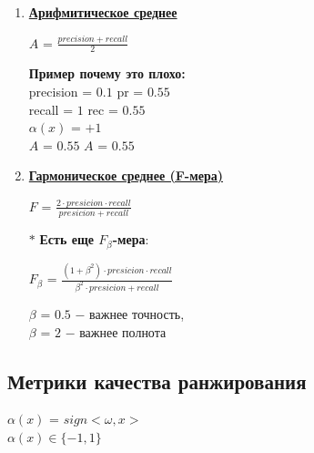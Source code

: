             \begin{enumerate}
                \item \underline{\textbf{Арифмитическое среднее}}\\
                    \begin{center}
                        $A$ = $\frac{precision + recall}{2}$
                    \end{center}
                    
                    \textbf{Пример почему это плохо:}\\
                    
                    precision = $0.1$ \quad\quad\quad pr = $0.55$\\
                    recall = $1$ \quad\quad\quad\quad\quad rec = $0.55$\\
                    $\alpha(x)$ = $+1$\\
                    $A$ = $0.55$ \quad\quad\quad\quad\quad $A$ = $0.55$



                \item \underline{\textbf{Гармоническое среднее (F-мера)}}\\
                    \begin{center}
                        \Large{$F$ = $\frac{2\cdot presicion \cdot recall}{presicion + recall}$}
                    \end{center}

                    $\ast$ \textbf{Есть еще $F_\beta$-мера}:
                    \begin{center}
                        \large{$F_\beta$ = $\frac{(1 + \beta^2)\cdot presicion \cdot recall}{\beta^2\cdot presicion + recall}$}
                    \end{center}
                    $\beta$ = $0.5$ $-$ важнее точность,\\
                    $\beta$ = $2$ $-$ важнее полнота
                    
            \end{enumerate}

    \subsection{Метрики качества ранжирования}
        \begin{center}
            $\alpha(x)$ = $sign <\omega, x>$\\
            $\alpha(x) \in \{-1, 1\}$
        \end{center}

